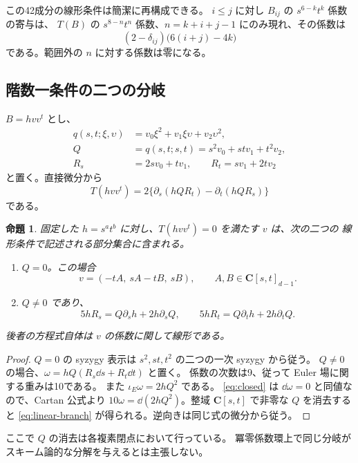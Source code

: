 \documentclass[11pt,a4paper]{ltjsarticle}
\newcommand{\CC}{\mathbf C}\newcommand{\QQ}{\mathbf Q}
\newtheorem{proposition}[theorem]{命題}
\theoremstyle{remark}\newtheorem{remark}[theorem]{注意}
\begin{document}
この42成分の線形条件は簡潔に再構成できる。
$i\le j$ に対し $B_{ij}$ の $s^{6-k}t^k$ 係数の寄与は、
$T(B)$ の $s^{8-n}t^n$ 係数、$n=k+i+j-1$ にのみ現れ、その係数は
\[
                  (2-\delta_{ij})\bigl(6(i+j)-4k\bigr)
\]
である。範囲外の $n$ に対する係数は零になる。

\subsection{階数一条件の二つの分岐}

$B=hvv^t$ とし、
\[
\begin{split}
 q(s,t;\xi,\upsilon)&=v_0\xi^2+v_1\xi\upsilon+v_2\upsilon^2,\\
 Q&=q(s,t;s,t)=s^2v_0+st v_1+t^2v_2,\\
 R_s&=2sv_0+tv_1,\qquad R_t=sv_1+2tv_2
\end{split}
\]
と置く。直接微分から
\begin{equation}\label{eq:closed}
 T(hvv^t)=2\{\partial_s(hQR_t)-\partial_t(hQR_s)\}
\end{equation}
である。

\begin{proposition}\label{prop:branches}
固定した $h=s^at^b$ に対し、$T(hvv^t)=0$ を満たす $v$ は、次の二つの
線形条件で記述される部分集合に含まれる。
\begin{enumerate}
 \item $Q=0$。この場合
 \[
 v=(-tA,\ sA-tB,\ sB),\qquad A,B\in\CC[s,t]_{d-1}.
 \]
 \item $Q\ne0$ であり、
 \begin{equation}\label{eq:linear-branch}
 5hR_s=Q\partial_sh+2h\partial_sQ,\qquad
 5hR_t=Q\partial_th+2h\partial_tQ.
 \end{equation}
\end{enumerate}
後者の方程式自体は $v$ の係数に関して線形である。
\end{proposition}
\begin{proof}
$Q=0$ の syzygy 表示は $s^2,st,t^2$ の二つの一次 syzygy から従う。
$Q\ne0$ の場合、$\omega=hQ(R_s\dd s+R_t\dd t)$ と置く。
係数の次数は9、従って Euler 場に関する重みは10である。
また $\iota_E\omega=2hQ^2$ である。
\eqref{eq:closed} は $\dd\omega=0$ と同値なので、Cartan 公式より
$10\omega=\dd(2hQ^2)$。整域 $\CC[s,t]$ で非零な $Q$ を消去すると
\eqref{eq:linear-branch} が得られる。逆向きは同じ式の微分から従う。
\end{proof}

ここで $Q$ の消去は各複素閉点において行っている。
冪零係数環上で同じ分岐がスキーム論的な分解を与えるとは主張しない。
\end{document}
